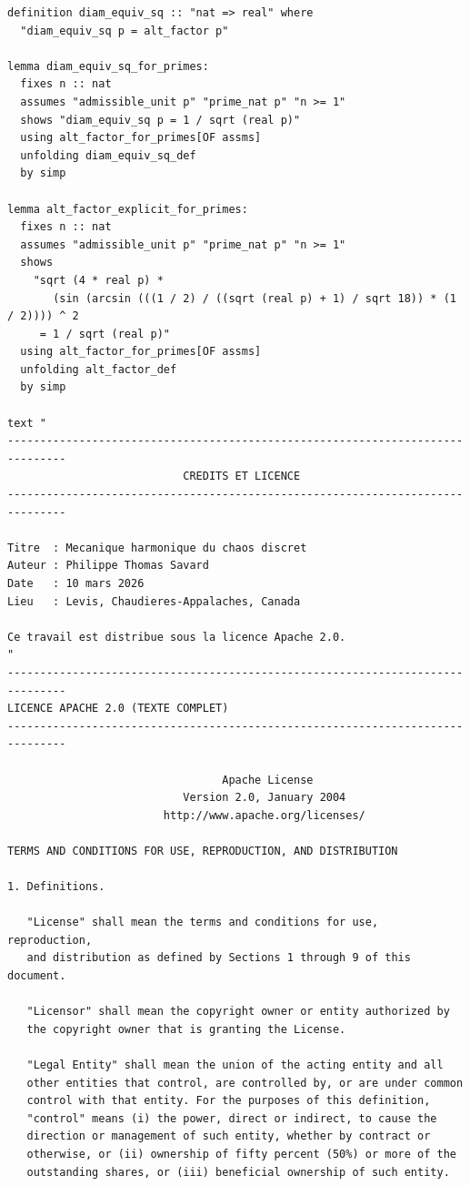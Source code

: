 \documentclass[12pt,a4paper]{article}
\theoremstyle{definition}
\theoremstyle{remark}
\begin{document}
\begin{verbatim}
definition diam_equiv_sq :: "nat => real" where
  "diam_equiv_sq p = alt_factor p"

lemma diam_equiv_sq_for_primes:
  fixes n :: nat
  assumes "admissible_unit p" "prime_nat p" "n >= 1"
  shows "diam_equiv_sq p = 1 / sqrt (real p)"
  using alt_factor_for_primes[OF assms]
  unfolding diam_equiv_sq_def
  by simp

lemma alt_factor_explicit_for_primes:
  fixes n :: nat
  assumes "admissible_unit p" "prime_nat p" "n >= 1"
  shows
    "sqrt (4 * real p) *
       (sin (arcsin (((1 / 2) / ((sqrt (real p) + 1) / sqrt 18)) * (1 / 2)))) ^ 2
     = 1 / sqrt (real p)"
  using alt_factor_for_primes[OF assms]
  unfolding alt_factor_def
  by simp

text "
-------------------------------------------------------------------------------
                           CREDITS ET LICENCE
-------------------------------------------------------------------------------

Titre  : Mecanique harmonique du chaos discret
Auteur : Philippe Thomas Savard
Date   : 10 mars 2026
Lieu   : Levis, Chaudieres-Appalaches, Canada

Ce travail est distribue sous la licence Apache 2.0.
"
-------------------------------------------------------------------------------
LICENCE APACHE 2.0 (TEXTE COMPLET)
-------------------------------------------------------------------------------

                                 Apache License
                           Version 2.0, January 2004
                        http://www.apache.org/licenses/

TERMS AND CONDITIONS FOR USE, REPRODUCTION, AND DISTRIBUTION

1. Definitions.

   "License" shall mean the terms and conditions for use, reproduction,
   and distribution as defined by Sections 1 through 9 of this document.

   "Licensor" shall mean the copyright owner or entity authorized by
   the copyright owner that is granting the License.

   "Legal Entity" shall mean the union of the acting entity and all
   other entities that control, are controlled by, or are under common
   control with that entity. For the purposes of this definition,
   "control" means (i) the power, direct or indirect, to cause the
   direction or management of such entity, whether by contract or
   otherwise, or (ii) ownership of fifty percent (50%) or more of the
   outstanding shares, or (iii) beneficial ownership of such entity.


\end{verbatim}
\end{document}

